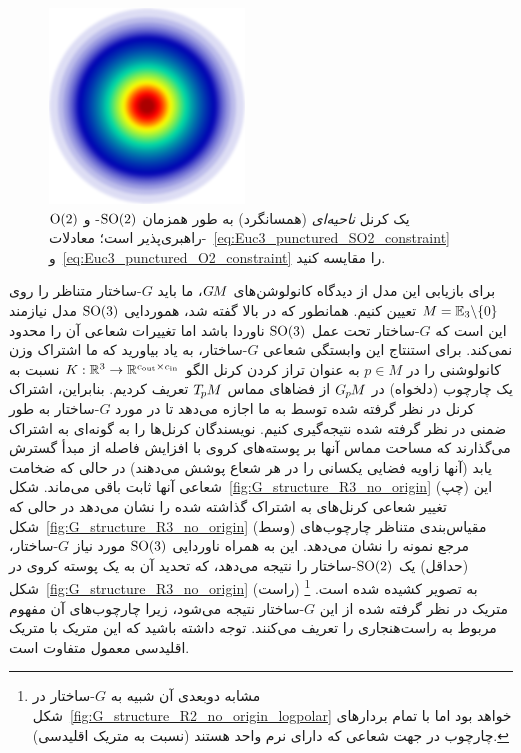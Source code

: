 \begin{figure}
	\vspace*{-3.ex}
	\centering
	\includegraphics[width=.8\linewidth]{figures/invariant_kernel.png}%
	\caption{\small
		یک کرنل \emph{ناحیه‌ای} (همسانگرد) به طور همزمان $\operatorname{SO}(2)$- و $\operatorname{O}(2)$-راهبری‌پذیر است؛
		معادلات~\eqref{eq:Euc3_punctured_SO2_constraint} و~\eqref{eq:Euc3_punctured_O2_constraint} را مقایسه کنید.
	}
	\label{fig:zonal_kernel}
\end{figure}%
برای بازیابی این مدل از دیدگاه کانولوشن‌های $G\mkern-1.4muM$، ما باید $G$-ساختار متناظر را روی $M = \mathbb{E}_3 \backslash \{0\}$ تعیین کنیم.
همانطور که در بالا گفته شد، هموردایی $\operatorname{SO}(3)$ مدل نیازمند این است که $G$-ساختار تحت عمل $\operatorname{SO}(3)$ ناوردا باشد اما تغییرات شعاعی آن را محدود نمی‌کند.
برای استنتاج این وابستگی شعاعی $G$-ساختار، به یاد بیاورید که ما اشتراک وزن کانولوشنی را در $p\in M$ به عنوان تراز کردن کرنل الگو $K: \mathbb{R}^3 \to \mathbb{R}^{{c_\textup{out}}\times{c_\textup{in}}}$ نسبت به یک چارچوب (دلخواه) در $G_{\mkern-1.3mu p}\mkern-1.2muM$ از فضاهای مماس $T_{\mkern-1.5mu p}\mkern-.5muM$ تعریف کردیم.
بنابراین، اشتراک کرنل در نظر گرفته شده توسط \citet{ramasinghe2019representation} به ما اجازه می‌دهد تا در مورد $G$-ساختار به طور ضمنی در نظر گرفته شده نتیجه‌گیری کنیم.
نویسندگان کرنل‌ها را به گونه‌ای به اشتراک می‌گذارند که مساحت مماس آنها بر پوسته‌های کروی با افزایش فاصله از مبدأ گسترش یابد (آنها زاویه فضایی یکسانی را در هر شعاع پوشش می‌دهند) در حالی که ضخامت شعاعی آنها ثابت باقی می‌ماند.
شکل~\ref{fig:G_structure_R3_no_origin} (چپ) این تغییر شعاعی کرنل‌های به اشتراک گذاشته شده را نشان می‌دهد در حالی که
شکل~\ref{fig:G_structure_R3_no_origin} (وسط) مقیاس‌بندی متناظر چارچوب‌های مرجع نمونه را نشان می‌دهد.
این به همراه ناوردایی $\operatorname{SO}(3)$ مورد نیاز $G$-ساختار، (حداقل) یک $\operatorname{SO}(2)$-ساختار را نتیجه می‌دهد، که تحدید آن به یک پوسته کروی در شکل~\ref{fig:G_structure_R3_no_origin} (راست) به تصویر کشیده شده است.%
\footnote{
	مشابه دوبعدی آن شبیه به $G$-ساختار در شکل~\ref{fig:G_structure_R2_no_origin_logpolar} خواهد بود اما با تمام بردارهای چارچوب در جهت شعاعی که دارای نرم واحد هستند (نسبت به متریک اقلیدسی).
}
متریک در نظر گرفته شده از این $G$-ساختار نتیجه می‌شود، زیرا چارچوب‌های آن مفهوم مربوط به راست‌هنجاری را تعریف می‌کنند.
توجه داشته باشید که این متریک با متریک اقلیدسی معمول متفاوت است.


